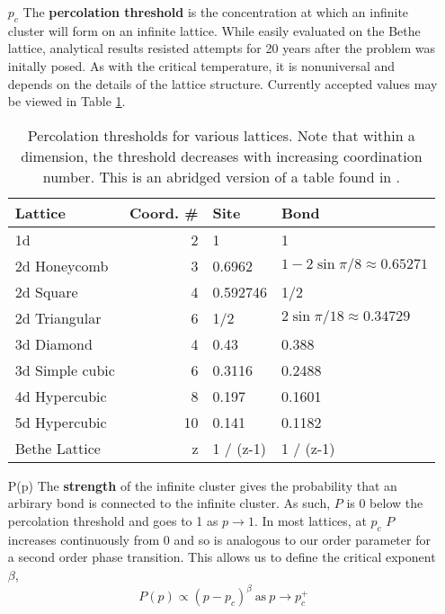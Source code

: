 \begin{enumerate}

\item[$p_c$] The \textbf{percolation threshold} is the concentration at which an infinite cluster
will form on an infinite lattice.  While easily evaluated on the Bethe lattice, analytical
results resisted attempts for 20 years after the problem was initally posed.  As with
the critical temperature, it is nonuniversal and depends on the details of the lattice
structure.  Currently accepted values may be viewed in Table \ref{tab:perc_thresh}.

\begin{table}
  \centering
  \begin{tabular}{ | l | r | l | l | }
    \hline
    Lattice & Coord. \# & Site & Bond \\
    \hline \hline
    1d & 2 & 1 & 1 \\ \hline
    2d Honeycomb & 3 & 0.6962 & $1-2\sin{\pi/8}\approx 0.65271$ \\ \hline
    2d Square & 4 & 0.592746 & 1/2 \\ \hline
    2d Triangular & 6 & 1/2 & $2\sin{\pi/18}\approx 0.34729$ \\ \hline
    3d Diamond & 4 & 0.43 & 0.388 \\ \hline
    3d Simple cubic & 6 & 0.3116 & 0.2488 \\ \hline
    4d Hypercubic & 8 & 0.197 & 0.1601 \\ \hline
    5d Hypercubic & 10 & 0.141 & 0.1182 \\ \hline
    Bethe Lattice & z & 1 / (z-1) & 1 / (z-1) \\ \hline
  \end{tabular}
  \caption{Percolation thresholds for various lattices.  Note that within a dimension,
           the threshold decreases with increasing coordination number.  This is an
           abridged version of a table found in \cite{christensen02}.}
  \label{tab:perc_thresh}
\end{table}

\item[P(p)] The \textbf{strength} of the infinite cluster gives the probability that
an arbirary bond is connected to the infinite cluster.  As such, $P$ is 0 below
the percolation threshold and goes to 1 as $p\to 1$.  In most lattices, at $p_c$
$P$ increases continuously from 0 and so is analogous to our order parameter for a second
order phase transition.  This allows us to define the critical exponent $\beta$,
\[ P(p) \propto (p - p_c)^{\beta} \ \text{as}\ p\to p_c^+ \]


\end{enumerate}
